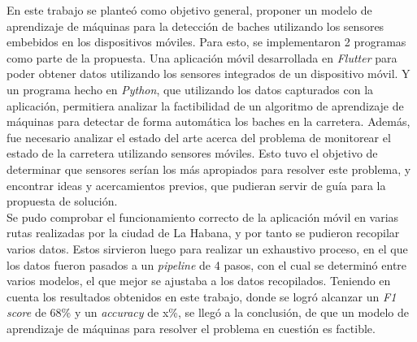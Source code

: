 \begin{conclusions}
	En este trabajo se planteó como objetivo general, proponer un modelo de aprendizaje de máquinas para la detección de baches
	utilizando los sensores embebidos en los dispositivos móviles. Para esto, se implementaron 2 programas como parte de la propuesta.
	Una aplicación móvil desarrollada en \emph{Flutter} para poder obtener datos utilizando los sensores integrados de un dispositivo
	móvil. Y un programa hecho en \emph{Python}, que utilizando los datos capturados con la aplicación, permitiera analizar la
	factibilidad de un algoritmo de aprendizaje de máquinas para detectar de forma automática los baches en la carretera. Además,
	fue necesario analizar el estado del arte acerca del problema de monitorear el estado de la carretera utilizando sensores móviles.
	Esto tuvo el objetivo de determinar que sensores serían los más apropiados para resolver este problema, y encontrar ideas y
	acercamientos previos, que pudieran servir de guía para la propuesta de solución.\\

	Se pudo comprobar el funcionamiento correcto de la aplicación móvil en varias rutas realizadas por la ciudad de La Habana, y 
	por tanto se pudieron recopilar varios datos. Estos sirvieron luego para realizar un exhaustivo proceso, en el que los datos 
	fueron pasados a un \emph{pipeline} de 4 pasos, con el cual se determinó entre varios modelos, el que mejor se ajustaba a los
	datos recopilados. Teniendo en cuenta los resultados obtenidos en este trabajo, donde se logró alcanzar un \emph{F1 score} de
	68\% y un \emph{accuracy} de x\%, se llegó a la conclusión, de que un modelo de aprendizaje de máquinas para resolver el
	problema en cuestión es factible.
\end{conclusions}
